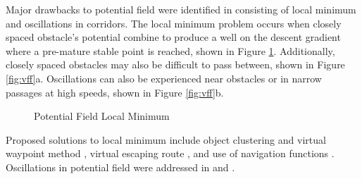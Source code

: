 \documentclass[numbered,pdftex]{ohio-etd}
\begin{document}
Major drawbacks to potential field were identified in \cite{koren_potential_1991} consisting of local minimum and oscillations in corridors. The local minimum problem occurs when closely spaced obstacle's potential combine to produce a well on the descent gradient where a pre-mature stable point is reached, shown in Figure \ref{fig:pfLocalMin}. Additionally, closely spaced obstacles may also be difficult to pass between, shown in Figure \ref{fig:vff}a. Oscillations can also be experienced near obstacles or in narrow passages at high speeds, shown in Figure \ref{fig:vff}b.



 

\begin{figure}[H]
	\begin{subfigmatrix}{2}%
		\centering
	\end{subfigmatrix}
	\caption{Potential Field Local Minimum \cite{liu_virtual-waypoint_2016}}
	\label{fig:pfLocalMin}
\end{figure}

Proposed solutions to local minimum include object clustering and virtual waypoint method \cite{liu_virtual-waypoint_2016}, virtual escaping route \cite{kim_escaping_2009}, and use of navigation functions \cite{goerzen_survey_2010}. Oscillations in potential field were addressed in \cite{lei_tang_novel_2010} and \cite{li_efficient_2012}.
\end{document}
